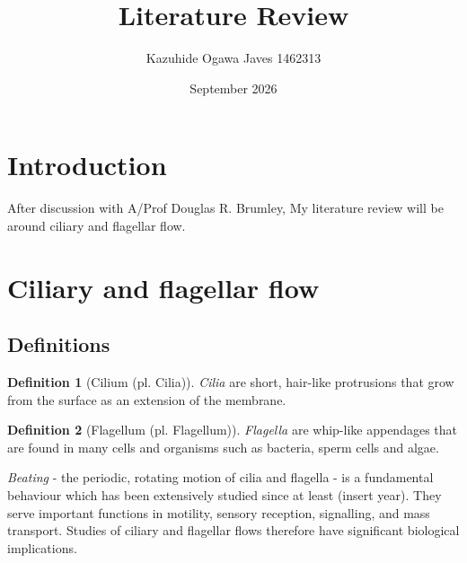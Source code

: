 \documentclass{article}
\title{Literature Review}
\author{Kazuhide Ogawa Javes 1462313}
\date{September 2026}
\theoremstyle{definition}
\newtheorem{definition}{Definition}[section]
\numberwithin{equation}{subsection}
\begin{document}
\maketitle

\section{Introduction}
After discussion with A/Prof Douglas R. Brumley, My literature review will be around ciliary and flagellar flow.

\section{Ciliary and flagellar flow}
\subsection{Definitions}
\begin{mdframed}
\begin{definition}[Cilium (pl. Cilia)]
\textit{Cilia} are short, hair-like protrusions that grow from the surface as an extension of the membrane. \cite{mizunoStructuralStudiesCiliary2012}
\end{definition}
\end{mdframed}

\begin{mdframed}
\begin{definition}[Flagellum (pl. Flagellum)]
\textit{Flagella} are whip-like appendages that are found in many cells and organisms such as bacteria, sperm cells and algae.
\cite{brumleyFlagellarSynchronizationDirect2014}
\end{definition}
\end{mdframed}
\textit{Beating} - the periodic, rotating motion of cilia and flagella - is a fundamental behaviour which has been extensively studied since at least (insert year). They serve important functions in motility, sensory reception, signalling, and mass transport. Studies of ciliary and flagellar flows therefore have significant biological implications. \cite{mizunoStructuralStudiesCiliary2012}
\end{document}
